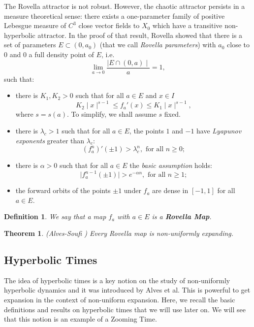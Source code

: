 \documentclass[12pt,a4paper]{amsart}
\theoremstyle{plain}
\newtheorem{theorem}{Theorem}[subsection]
\newtheorem{definition}{Definition}[subsection]
\begin{document}
The Rovella attractor is not robust. However, the chaotic attractor persists in a measure theoretical sense: there exists a one-parameter family of positive Lebesgue measure
of $C^{3}$ close vector fields to $X_{0}$ which have a transitive non-hyperbolic attractor. In the proof of that result, Rovella showed that there is a set of parameters
$E \subset (0,a_{0})$ (that we call \textit{Rovella parameters}) with $a_{0}$ close to $0$ and $0$ a full density point of $E$, i.e.
\[
\displaystyle \lim_{a \to 0} \frac{\mid E \cap (0,a) \mid}{a} = 1,
\]
such that:

\begin{itemize}
	\item[(C1)] there is $K_{1}, K_{2} > 0$ such that for all $a \in E$ and $x \in I$
	\[
	K_{2} \mid x \mid^{s-1} \leq f_{a}'(x) \leq K_{1} \mid x \mid^{s-1},
	\]
	where $s=s(a)$. To simplify, we shall assume $s$ fixed.
	
	\item[(C2)] there is $\lambda_{c} > 1$ such that for all $a \in E$, the points $1$ and $-1$ have \textit{Lyapunov exponents} greater than $\lambda_{c}$:
	\[
	(f_{a}^{n})'(\pm 1) > \lambda_{c}^{n}, \,\, \text{for all} \, \, n \geq 0;
	\]
	
	\item[(C3)] there is $\alpha > 0$ such that for all $a \in E$ the \textit{basic assumption} holds:
	\[
	\mid f_{a}^{n-1}(\pm 1)\mid > e^{-\alpha n}, \,\, \text{for all} \, \, n \geq 1;
	\]
	
	\item[(C4)] the forward orbits of the points $\pm 1$ under $f_{a}$ are dense in $[-1,1]$ for all $a \in E$.
\end{itemize}

\begin{definition}
	We say that a map $f_{a}$ with $a \in E$ is a \textbf{\textit{Rovella Map}}. 
\end{definition}

\begin{theorem}
	(Alves-Soufi \cite{AS}) Every Rovella map is non-uniformly expanding. 
\end{theorem}

\subsection{Hyperbolic Times}

The idea of hyperbolic times is a key notion on the study of non-uniformly hyperbolic dynamics and it was introduced by Alves et al. 
This is powerful to get expansion in the context of non-uniform expansion. Here, we recall the basic definitions and results on hyperbolic times that we will use later on. 
We will see that this notion is an example of a Zooming Time. 
\end{document}
